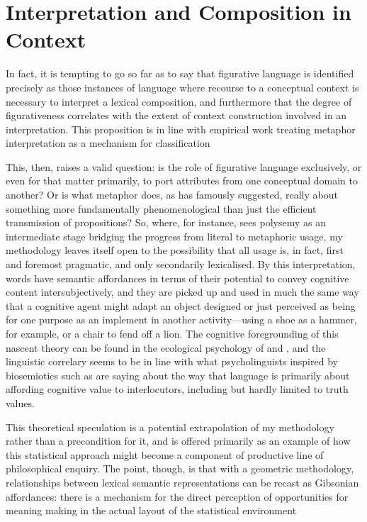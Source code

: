 \section{Interpretation and Composition in Context}

In fact, it is tempting to go so far as to say that figurative language is identified precisely as those instances of language where recourse to a conceptual context is necessary to interpret a lexical composition, and furthermore that the degree of figurativeness correlates with the extent of context construction involved in an interpretation.  This proposition is in line with  empirical work treating metaphor interpretation as a mechanism for classification

This, then, raises a valid question: is the role of figurative language exclusively, or even for that matter primarily, to port attributes from one conceptual domain to another?  Or is what metaphor does, as \cite{Davidson} has famously suggested, really about something more fundamentally phenomenological than just the efficient transmission of propositions?  So, where, for instance, \cite{Sweetser} sees polysemy as an intermediate stage bridging the progress from literal to metaphoric usage, my methodology leaves itself open to the possibility that all usage is, in fact, first and foremost pragmatic, and only secondarily lexicalised.  By this interpretation, words have semantic affordances in terms of their potential to convey cognitive content intersubjectively, and they are picked up and used in much the same way that a cognitive agent might adapt an object designed or just perceived as being for one purpose as an implement in another activity---using a shoe as a hammer, for example, or a chair to fend off a lion.  The cognitive foregrounding of this nascent theory can be found in the ecological psychology of \cite{Gibson} and \cite{Bateson}, and the linguistic correlary seems to be in line with what psycholinguists inspired by biosemiotics such as \cite{Raczsek} are saying about the way that language is primarily about affording cognitive value to interlocutors, including but hardly limited to truth values.

This theoretical speculation is a potential extrapolation of my methodology rather than a precondition for it, and is offered primarily as an example of how this statistical approach might become a component of productive line of philosophical enquiry.  The point, though, is that with a geometric methodology, relationships between lexical semantic representations can be recast as Gibsonian affordances: there is a mechanism for the direct perception of opportunities for meaning making in the actual layout of the statistical environment

